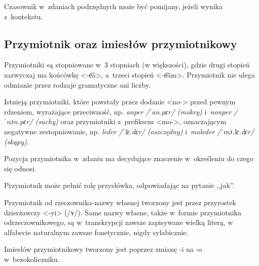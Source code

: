 \begin{spacing}{1.1}

Czasownik w~zdaniach podrzędnych może być pomijany, jeżeli wynika z~kontekstu.


\subsection{Przymiotnik oraz imiesłów przymiotnikowy}

Przymiotniki są stopniowane w~3 stopniach (w większości), gdzie drugi stopień 
zazwyczaj ma końcówkę <-e͞a>, a~trzeci stopień <-e͞am>. Przymiotnik nie ulega 
odmianie przez rodzaje gramatyczne ani liczby.

Istnieją przymiotniki, które powstały przez dodanie <no-> przed pewnym rdzeniem,
wyrażające przeciwność, np. \emph{anper /ˈan.pɛr/ (mokry)} i~\emph{nonper 
/ˈnɔn.pɛr/ (suchy)} oraz przymiotniki z~prefiksem <mo->, oznaczającym negatywne 
zestopniowanie, np. \emph{leder /ˈlɛ.dɛr/ (oszczędny)} i~\emph{moleder 
/ˈmɔ.lɛ.dɛr/ (skąpy)}.

Pozycja przymiotnika w~zdaniu ma decydujące znaczenie w~określeniu do czego się 
odnosi.





Przymiotnik może pełnić rolę przysłówka, odpowiadając na pytanie ,,jak''.


Przymiotnik od rzeczownika-nazwy własnej tworzony jest przez przyrostek 
dzierżawczy <-yi> (/ʏ/). Same nazwy własne, także w~formie przymiotnika 
odrzeczownikowego, są w~transkrypcji zawsze zapisywane wielką literą, w~
alfabecie naturalnym zawsze fonetycznie, nigdy sylabicznie.

Imiesłów przymiotnikowy tworzony jest poprzez zmianę -i na -o w~bezokoliczniku.


\end{spacing}
